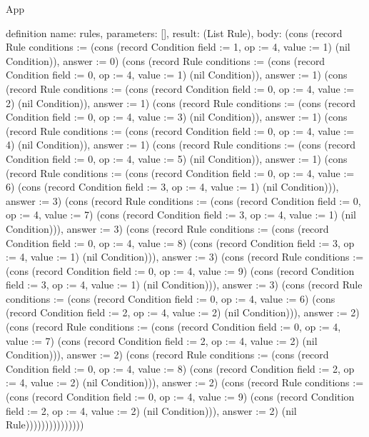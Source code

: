 \begin{lexlean}{App}
\begin{semanticmodule}
definition{
  name: rules,
  parameters: [],
  result: (List Rule),
  body: (cons (record Rule {conditions := (cons (record Condition {field := 1, op := 4, value := 1}) (nil Condition)), answer := 0}) (cons (record Rule {conditions := (cons (record Condition {field := 0, op := 4, value := 1}) (nil Condition)), answer := 1}) (cons (record Rule {conditions := (cons (record Condition {field := 0, op := 4, value := 2}) (nil Condition)), answer := 1}) (cons (record Rule {conditions := (cons (record Condition {field := 0, op := 4, value := 3}) (nil Condition)), answer := 1}) (cons (record Rule {conditions := (cons (record Condition {field := 0, op := 4, value := 4}) (nil Condition)), answer := 1}) (cons (record Rule {conditions := (cons (record Condition {field := 0, op := 4, value := 5}) (nil Condition)), answer := 1}) (cons (record Rule {conditions := (cons (record Condition {field := 0, op := 4, value := 6}) (cons (record Condition {field := 3, op := 4, value := 1}) (nil Condition))), answer := 3}) (cons (record Rule {conditions := (cons (record Condition {field := 0, op := 4, value := 7}) (cons (record Condition {field := 3, op := 4, value := 1}) (nil Condition))), answer := 3}) (cons (record Rule {conditions := (cons (record Condition {field := 0, op := 4, value := 8}) (cons (record Condition {field := 3, op := 4, value := 1}) (nil Condition))), answer := 3}) (cons (record Rule {conditions := (cons (record Condition {field := 0, op := 4, value := 9}) (cons (record Condition {field := 3, op := 4, value := 1}) (nil Condition))), answer := 3}) (cons (record Rule {conditions := (cons (record Condition {field := 0, op := 4, value := 6}) (cons (record Condition {field := 2, op := 4, value := 2}) (nil Condition))), answer := 2}) (cons (record Rule {conditions := (cons (record Condition {field := 0, op := 4, value := 7}) (cons (record Condition {field := 2, op := 4, value := 2}) (nil Condition))), answer := 2}) (cons (record Rule {conditions := (cons (record Condition {field := 0, op := 4, value := 8}) (cons (record Condition {field := 2, op := 4, value := 2}) (nil Condition))), answer := 2}) (cons (record Rule {conditions := (cons (record Condition {field := 0, op := 4, value := 9}) (cons (record Condition {field := 2, op := 4, value := 2}) (nil Condition))), answer := 2}) (nil Rule)))))))))))))))
}


\end{semanticmodule}
\end{lexlean}
